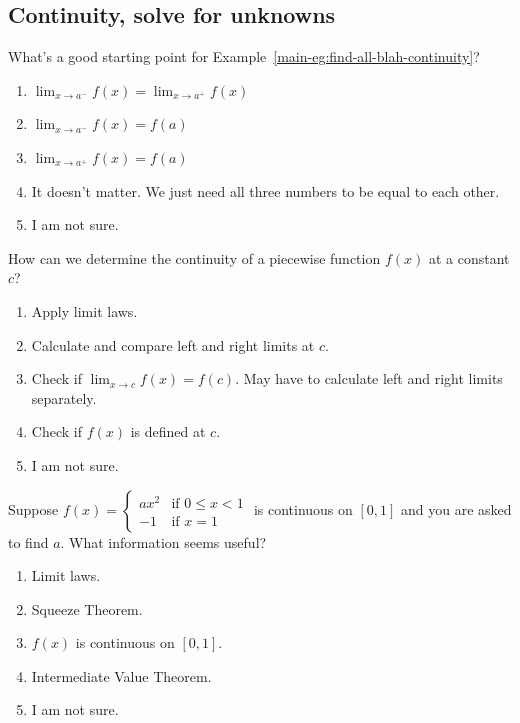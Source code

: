 \documentclass[aspectratio=169, 14pt, t]{beamer}  %
\begin{document}
\subsection{Continuity, solve for unknowns}

\begin{poll}
  What's a good starting point for Example~\ref{main-eg:find-all-blah-continuity}?

  \begin{enumerate}
    \item \(\lim_{x \to a^{-}} f(x) = \lim_{x \to a^{+}} f(x)\)
    \item \(\lim_{x \to a^{-}} f(x) = f(a)\)
    \item \(\lim_{x \to a^{+}} f(x) = f(a)\)
    \item It doesn't matter. We just need all three numbers to be equal to each other.
    \item I am not sure.
  \end{enumerate}
\end{poll}

\begin{poll}
  How can we determine the continuity of a piecewise function \(f(x)\) at a constant \(c\)?

  \begin{enumerate}
    \item Apply limit laws.
    \item Calculate and compare left and right limits at \(c\).
    \item Check if \(\lim_{x \to c}f(x) = f(c)\). May have to calculate left and right limits separately.
    \item Check if \(f(x)\) is defined at \(c\).
    \item I am not sure.
  \end{enumerate}
\end{poll}

\begin{poll}
  Suppose \(f(x) = \begin{cases} ax^{2} &\text{if } 0 \le x < 1 \\ -1 &\text{if } x = 1 \end{cases}\) is continuous on \([0,1]\) and you are asked to find \(a\). What information seems useful?

  \begin{enumerate}
    \item Limit laws.
    \item Squeeze Theorem.
    \item \(f(x)\) is continuous on \([0,1]\).
    \item Intermediate Value Theorem.
    \item I am not sure.
  \end{enumerate}
\end{poll}
\end{document}
